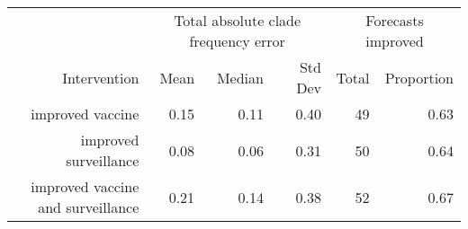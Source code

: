 
\begin{tabular*}{1.0\textwidth}{rrrrrr}
\toprule
             & \multicolumn{3}{c}{Total absolute clade frequency error} & \multicolumn{2}{c}{Forecasts improved} \\
Intervention & Mean & Median & Std Dev & Total & Proportion \\
\midrule

improved vaccine & 0.15 & 0.11 & 0.40 & 49 & 0.63 \\
improved surveillance & 0.08 & 0.06 & 0.31 & 50 & 0.64 \\
improved vaccine and surveillance & 0.21 & 0.14 & 0.38 & 52 & 0.67 \\

\bottomrule
\end{tabular*}

